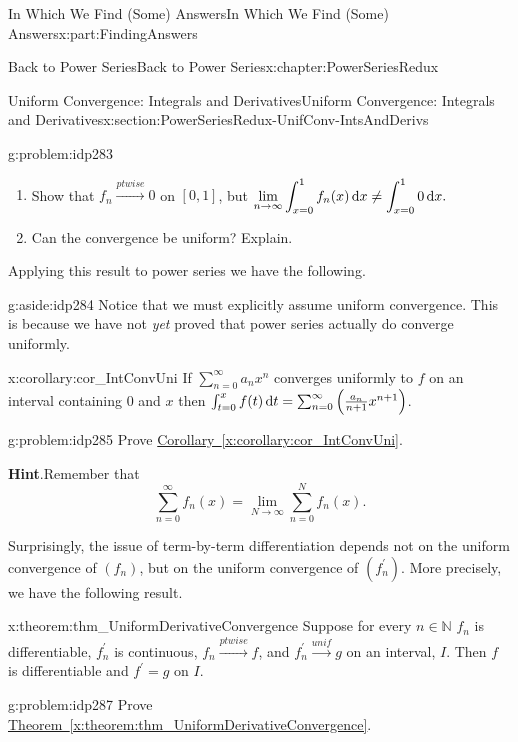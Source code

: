 \documentclass[oneside,10pt,]{book}
\newcommand{\blocktitlefont}{\relax}
\newcommand{\xreffont}{\relax}
\numberwithin{equation}{section}
\newcommand{\dx}[1]{\,{\rm d}#1}
\def\limit#1#2#3{{\displaystyle\lim_{#1\rightarrow #2}#3}}
\newcommand{\unif}{\stackrel{unif}{\longrightarrow}}
\newcommand{\ptwise}{\stackrel{ptwise}{\longrightarrow}}
\newcommand{\NN}{\mathbb {N}}
\begin{document}
\begin{partptx}{In Which We Find (Some) Answers}{}{In Which We Find (Some) Answers}{}{}{x:part:FindingAnswers}
\begin{chapterptx}{Back to Power Series}{}{Back to Power Series}{}{}{x:chapter:PowerSeriesRedux}
\begin{sectionptx}{Uniform Convergence: Integrals and Derivatives}{}{Uniform Convergence: Integrals and Derivatives}{}{}{x:section:PowerSeriesRedux-UnifConv-IntsAndDerivs}
\begin{introduction}{}
\begin{problem}{}{g:problem:idp283}
\begin{enumerate}[label=(\alph*)]
\item{}Show that \(f_n\ptwise 0\) on \([0,1]\), but \(\limit{n}{\infty}{\int_{x=0}^1f_n(x)\dx{ x}\neq\int_{x=0}^10\dx{ x}.}\)%
\item{}Can the convergence be uniform? Explain.%
\end{enumerate}
%
\end{problem}
Applying this result to power series we have the following.%
\begin{aside}{}{g:aside:idp284}%
Notice that we must explicitly assume uniform convergence. This is because we have not \emph{yet} proved that power series actually do converge uniformly.%
\end{aside}
\begin{corollary}{}{}{x:corollary:cor_IntConvUni}%
If \(\sum_{n=0}^\infty a_nx^n\) converges uniformly to \(f\) on an interval containing \(0\) and \(x\) then \(\int_{t=0}^xf(t)\dx{ t}=\sum_{n=0}^\infty\left(\frac{a_n}{n+1}x^{n+1}\right)\).%
\end{corollary}
\begin{problem}{}{g:problem:idp285}%
 Prove \hyperref[x:corollary:cor_IntConvUni]{Corollary~{\xreffont\ref{x:corollary:cor_IntConvUni}}}.%
\par\smallskip%
\noindent\textbf{\blocktitlefont Hint}.\hypertarget{g:hint:idp286}{}\quad{}Remember that%
\begin{equation*}
\displaystyle \sum_{n=0}^\infty f_n(x) = \lim_{N\rightarrow\infty}\sum_{n=0}^N f_n(x). 
\end{equation*}
%
\end{problem}
Surprisingly, the issue of term-by-term differentiation depends not on the uniform convergence of \(\left(f_n\right)\), but on the uniform convergence of \(\left(f^\prime_n\right)\). More precisely, we have the following result.%
\begin{theorem}{}{}{x:theorem:thm_UniformDerivativeConvergence}%
%
%
Suppose for every \(n\in\NN\) \(f_n\) is differentiable, \(f_n^\prime\) is continuous, \(f_n\ptwise f\), and \(f_n^\prime\unif g\) on an interval, \(I\).  Then \(f\) is differentiable and \(f^\prime = g\) on \(I\).%
\end{theorem}
\begin{problem}{}{g:problem:idp287}%
Prove \hyperref[x:theorem:thm_UniformDerivativeConvergence]{Theorem~{\xreffont\ref{x:theorem:thm_UniformDerivativeConvergence}}}.%
\par\smallskip%

\end{problem}
\end{introduction}
\end{sectionptx}
\end{chapterptx}
\end{partptx}
\end{document}
